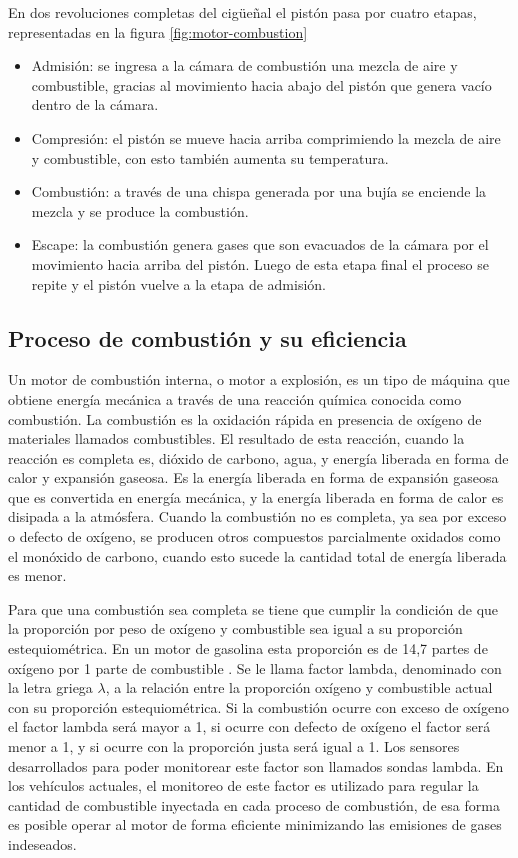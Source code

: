 En dos revoluciones completas del cigüeñal el pistón pasa por cuatro etapas, representadas en la figura \ref{fig:motor-combustion}
\begin{itemize}
\item{Admisión:} se ingresa a la cámara de combustión una mezcla de aire y combustible, gracias al movimiento hacia abajo del pistón que genera vacío dentro de la cámara.
\item{Compresión:} el pistón se mueve hacia arriba comprimiendo la mezcla de aire y combustible, con esto también aumenta su temperatura.
\item{Combustión:} a través de una chispa generada por una bujía se enciende la mezcla y se produce la combustión.
\item{Escape:} la combustión genera gases que son evacuados de la cámara por el movimiento hacia arriba del pistón. Luego de esta etapa final el proceso se repite y el pistón vuelve a la etapa de admisión.
\end{itemize}

\subsection{Proceso de combustión y su eficiencia}

Un motor de combustión interna, o motor a explosión, es un tipo de máquina que obtiene energía mecánica a través de una reacción química conocida como combustión. La combustión es la oxidación rápida en presencia de oxígeno de materiales llamados combustibles. El resultado de esta reacción, cuando la reacción es completa es, dióxido de carbono, agua, y energía liberada en forma de calor y expansión gaseosa. Es la energía liberada en forma de expansión gaseosa que es convertida en energía mecánica, y la energía liberada en forma de calor es disipada a la atmósfera. Cuando la combustión no es completa, ya sea por exceso o defecto de oxígeno, se producen otros compuestos parcialmente oxidados como el monóxido de carbono, cuando esto sucede la cantidad total de energía liberada es menor.

Para que una combustión sea completa se tiene que cumplir la condición de que la proporción por peso de oxígeno y combustible sea igual a su proporción estequiométrica. En un motor de gasolina esta proporción es de 14,7 partes de oxígeno por 1 parte de combustible \citep{book-afr}. Se le llama factor lambda, denominado con la letra griega $\lambda$, a la relación entre la proporción oxígeno y combustible actual con su proporción estequiométrica. Si la combustión ocurre con exceso de oxígeno el factor lambda será mayor a 1, si ocurre con defecto de oxígeno el factor será menor a 1, y si ocurre con la proporción justa será igual a 1. Los sensores desarrollados para poder monitorear este factor son llamados sondas lambda. En los vehículos actuales, el monitoreo de este factor es utilizado para regular la cantidad de combustible inyectada en cada proceso de combustión, de esa forma es posible operar al motor de forma eficiente minimizando las emisiones de gases indeseados.

